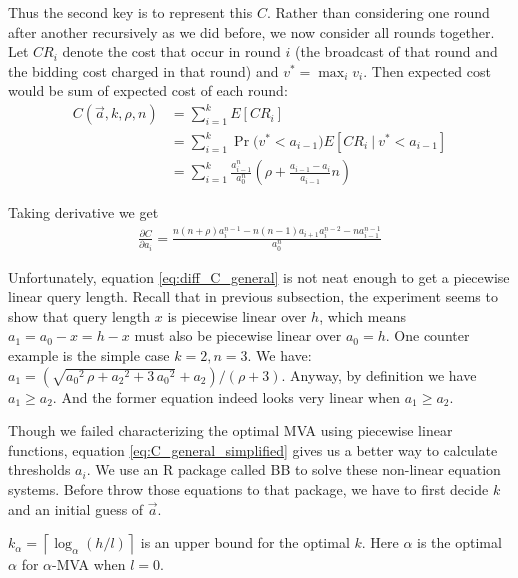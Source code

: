 Thus the second key is to represent this $C$. Rather than
considering one round after another recursively as we did before, we now consider all
rounds together. Let $CR_i$ denote the cost that occur in round $i$ (the broadcast
of that round and the bidding cost charged in that round) and $v^* = \max_i v_i$. Then expected cost
would be sum of expected cost of each round:
\begin{align}
C(\vec a, k, \rho, n) &= \sum_{i=1}^k E[ CR_i ] \nonumber \\
  &= \sum_{i=1}^{k} \Pr\big( v^* < a_{i-1} \big) E[CR_i ~|~ v^* < a_{i-1}] \nonumber \\
  &= \sum_{i=1}^{k} \frac{a_{i-1}^n}{a_0^n} \left( \rho + \frac{a_{i-1}-a_{i}}{a_{i-1}} n \right)
  \label{eq:C_general_simplified}
\end{align}

Taking derivative we get
\begin{align}
 \frac{\partial C}{\partial a_i} = \frac{
	n(n+\rho)a_i^{n-1}-n(n-1)a_{i+1}a_i^{n-2}-n a_{i-1}^{n-1} }{a_0^n}
	\label{eq:diff_C_general}
\end{align}

Unfortunately, equation
\ref{eq:diff_C_general} is not neat enough to get a piecewise linear query length.
Recall that in previous subsection, the experiment seems to show that query length $x$ is
piecewise linear over $h$, which means $a_1 = a_0-x = h-x$ must also be
piecewise linear over $a_0 = h$.  One counter example is the simple case $k = 2, n =
3$. We have: $a_1 =
(\sqrt{{a_0}^{2}\,\rho+{a_2}^{2}+3\,{a_0}^{2}}+a_2)/(\rho+3)$.  Anyway, by
definition we have $a_1 \geq a_2$. And
the former equation indeed looks very linear when $a_1 \geq a_2$.

Though we failed characterizing the optimal MVA using piecewise linear
functions, equation \ref{eq:C_general_simplified} gives us a better way to
calculate thresholds $a_i$. We use an R package called BB \cite{Varadhan2009:BB} to
solve these non-linear equation systems. Before throw those equations to that
package, we have to first decide $k$ and an initial guess of $\vec a$.

\begin{lemma}\label{lemma:k_upper}
$k_\alpha = \left\lceil \log_{\alpha} \left(h/l\right) \right\rceil$ is an
upper bound for the optimal $k$. Here $\alpha$ is the optimal $\alpha$ for
$\alpha$-MVA when $l = 0$. 
\end{lemma}

